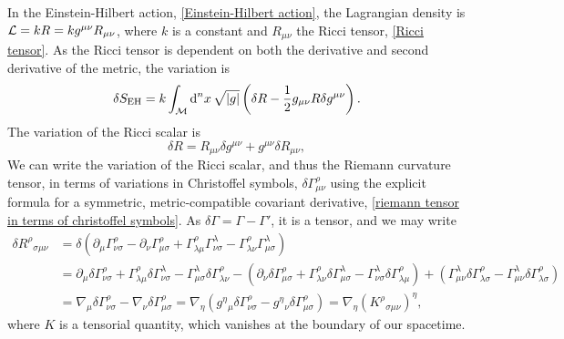 In the Einstein-Hilbert action, \autoref{Einstein-Hilbert action}, the Lagrangian density is $\mathcal{L} = k R = k g^{\mu \nu} R_{\mu \nu}$, where $k$ is a constant and $R_{\mu \nu}$ the Ricci tensor, \autoref{Ricci tensor}.
As the Ricci tensor is dependent on both the derivative and second derivative of the metric, the variation is
%
\begin{equation}
    \delta S_{\text{EH}} = k \int_{\mathcal{M}} \text{d}^n x \, \sqrt{|g|}
    \left( \delta R - \frac{1}{2} g_{\mu \nu} R \delta g^{\mu \nu} \right).
\end{equation}
%
The variation of the Ricci scalar is
%
\begin{equation}
    \delta R = R_{\mu \nu} \delta g^{\mu \nu} + g^{\mu \nu} \delta R_{\mu \nu},
\end{equation}
%
We can write the variation of the Ricci scalar, and thus the Riemann curvature tensor, in terms of variations in Christoffel symbols, $\delta \Gamma^{\rho}_{\mu \nu}$ using the explicit formula for a symmetric, metric-compatible covariant derivative, \autoref{riemann tensor in terms of christoffel symbols}.
As $\delta \Gamma = \Gamma - \Gamma'$, it is a tensor, and we may write
%
\begin{align*}
    \delta R^\rho{}_{\sigma \mu \nu} 
    & = \delta(
        \partial_{\mu} \Gamma^\rho_{\nu \sigma} 
        - \partial_{\nu} \Gamma^\rho_{\mu \sigma}
        + \Gamma^\rho_{\lambda \mu} \Gamma^\lambda_{\nu \sigma}
        - \Gamma^\rho_{\lambda \nu} \Gamma^\lambda_{\mu \sigma}
        )\\
    & = \partial_{\mu} \delta \Gamma^\rho_{\nu \sigma} 
        + \Gamma^\rho_{\lambda \mu}\delta \Gamma^\lambda_{\nu \sigma}
        - \Gamma^\lambda_{\mu \sigma}   \delta \Gamma^\rho_{\lambda \nu}
        - \left( 
            \partial_{\nu} \delta \Gamma^\rho_{\mu \sigma} 
            + \Gamma^\rho_{\lambda \nu}\delta \Gamma^\lambda_{\mu \sigma}
            - \Gamma^\lambda_{\nu \sigma} \delta \Gamma^\rho_{\lambda \mu} 
        \right) 
        + (\Gamma^{\lambda}_{\mu\nu}\delta\Gamma^\rho_{\lambda \sigma} 
        - \Gamma^{\lambda}_{\mu\nu}\delta\Gamma^\rho_{\lambda \sigma}) \\
    & = \nabla_{\mu}\delta \Gamma^\rho_{\nu \sigma} 
        - \nabla_{\nu}\delta \Gamma^\rho_{\mu \sigma}
     = \nabla_\eta \left(g^\eta{}_{\mu} \delta\Gamma^\rho_{\nu \sigma} 
        - g^\eta{}_{\nu} \delta\Gamma^\rho_{\mu \sigma} \right) 
    = \nabla_\eta (K^\rho{}_{\sigma \mu \nu})^\eta,
\end{align*}
%
where $K$ is a tensorial quantity, which vanishes at the boundary of our spacetime.
